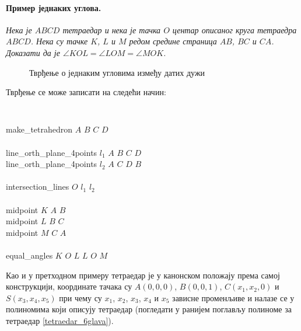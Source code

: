 \paragraph{Пример једнаких углова.} \emph{Нека је $ABCD$ тетраедар и нека 
је тачка $O$ центар описаног круга тетраедра $ABCD$. Нека су тачке
$K$, $L$ и $M$ редом средине страница $AB$, $BC$ и $CA$. Доказати да
је $\angle KOL = \angle LOM = \angle MOK$.}

\begin{figure}[hb]
\begin{center}

\end{center}
\caption{Тврђење о једнаким угловима између датих дужи}
\end{figure}

Тврђење се може записати на следећи начин:

\begin{footnotesize}
{\tt
\begin{tabbing}
make\_tetrahedron $A$ $B$ $C$ $D$ \ \ \ \ \ \ \ \ \ \ \ \ \ \ \ \ \ \ \= \\ \\

line\_orth\_plane\_4points $l_1$ $A$ $B$ $C$ $D$ \\
line\_orth\_plane\_4points $l_2$ $A$ $C$ $D$ $B$ \\ \\

intersection\_lines $O$ $l_1$ $l_2$ \\ \\

midpoint $K$ $A$ $B$ \\
midpoint $L$ $B$ $C$ \\
midpoint $M$ $C$ $A$ \\ \\

equal\_angles  $K$ $O$ $L$ $L$ $O$ $M$
\end{tabbing}
}
\end{footnotesize}

Као и у претходном примеру тетраедар је у канонском положају према
самој конструкцији, координате тачака су $A(0, 0, 0)$, $B(0, 0, 1)$,
$C(x_1, x_2, 0)$ и $S(x_3, x_4, x_5)$ при чему су $x_1$, $x_2$, $x_3$,
$x_4$ и $x_5$ зависне променљиве и налазе се у полиномима који описују
тетраедар (погледати у ранијем поглављу полиноме за тетраедар
\ref{tetraedar_6glava}).

